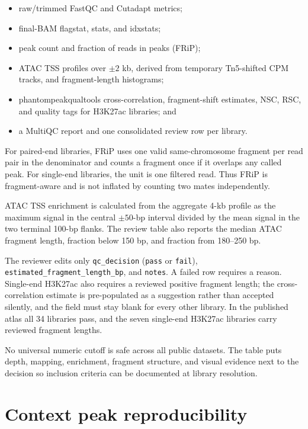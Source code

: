 \documentclass[11pt]{article}
\newcommand{\software}[1]{\textsf{#1}}
\begin{document}
\begin{itemize}
  \item raw/trimmed FastQC and Cutadapt metrics;
  \item final-BAM flagstat, stats, and idxstats;
  \item peak count and fraction of reads in peaks (FRiP);
  \item ATAC TSS profiles over \(\pm2\) kb, derived from temporary Tn5-shifted
  CPM tracks, and fragment-length histograms;
  \item \software{phantompeakqualtools} cross-correlation, fragment-shift
  estimates, NSC, RSC, and quality tags for H3K27ac libraries; and
  \item a MultiQC report and one consolidated review row per library.
\end{itemize}

For paired-end libraries, FRiP uses one valid same-chromosome fragment per read
pair in the denominator and counts a fragment once if it overlaps any called
peak.  For single-end libraries, the unit is one filtered read.  Thus FRiP is
fragment-aware and is not inflated by counting two mates independently.

ATAC TSS enrichment is calculated from the aggregate 4-kb profile as the
maximum signal in the central \(\pm50\)-bp interval divided by the mean signal
in the two terminal 100-bp flanks.  The review table also reports the median
ATAC fragment length, fraction below 150 bp, and fraction from 180--250 bp.

The reviewer edits only \texttt{qc\_decision} (\texttt{pass} or
\texttt{fail}), \texttt{estimated\_fragment\_length\_bp}, and \texttt{notes}.
A failed row requires a reason.  Single-end H3K27ac also requires a reviewed
positive fragment length; the cross-correlation estimate is pre-populated as a
suggestion rather than accepted silently, and the field must stay blank for
every other library.  In the published atlas all 34 libraries pass, and the
seven single-end H3K27ac libraries carry reviewed fragment lengths.

No universal numeric cutoff is safe across all public datasets.  The table
puts depth, mapping, enrichment, fragment structure, and visual evidence next
to the decision so inclusion criteria can be documented at library resolution.

\section{Context peak reproducibility}
\end{document}

